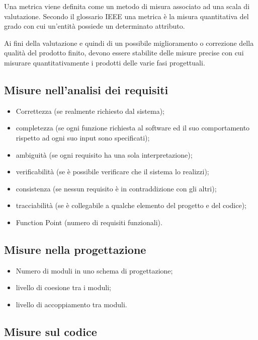 Una metrica viene definita come un metodo di misura associato ad una scala di
valutazione. Secondo il glossario IEEE una metrica \`e la misura quantitativa del
grado con cui un'entit\`a possiede un determinato attributo.

Ai fini della valutazione e quindi di un possibile miglioramento o
correzione della qualit\`a del prodotto finito, devono essere stabilite delle
misure precise con cui misurare quantitativamente i prodotti delle varie fasi
progettuali.


\subsection{Misure nell'analisi dei requisiti}

\begin{itemize}
  
\item Correttezza (se realmente richiesto dal sistema);
\item completezza (se ogni funzione richiesta al software ed il suo
comportamento rispetto ad ogni suo input sono specificati);
\item ambiguit\`a (se ogni requisito ha una sola interpretazione);
\item verificabilit\`a (se \`e possibile verificare che il sistema lo realizzi);
\item consistenza (se nessun requisito \`e in contraddizione con gli altri);
\item tracciabilit\`a (se \`e collegabile a qualche elemento del progetto e del
codice);
\item Function Point (numero di requisiti funzionali).

\end{itemize}


\subsection{Misure nella progettazione}

\begin{itemize}
  
\item Numero di moduli in uno schema di progettazione;
\item livello di coesione tra i moduli;
\item livello di accoppiamento tra moduli.

\end{itemize}


\subsection{Misure sul codice}

